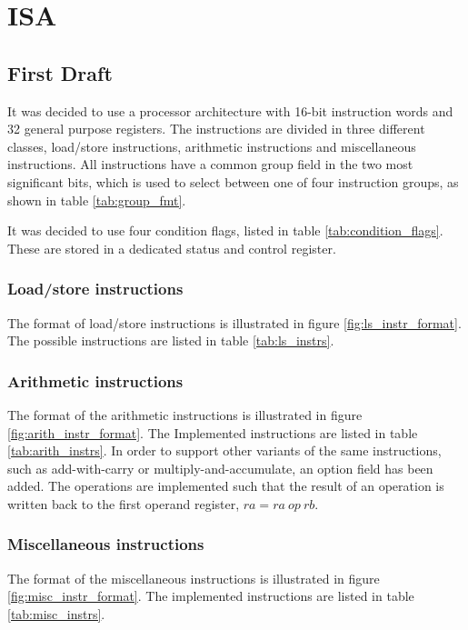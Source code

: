 \section{ISA}

\subsection{First Draft}
It was decided to use a processor architecture with 16-bit instruction words and 32 general purpose registers.
The instructions are divided in three different classes, load/store instructions, arithmetic instructions
and miscellaneous instructions. All instructions have a common group field in the two most significant bits,
which is used to select between one of four instruction groups, as shown in table \ref{tab:group_fmt}.

It was decided to use four condition flags, listed in table \ref{tab:condition_flags}. These are stored in
a dedicated status and control register.




\subsubsection{Load/store instructions}
The format of load/store instructions is illustrated in figure \ref{fig:ls_instr_format}. The possible
instructions are listed in table \ref{tab:ls_instrs}.




\subsubsection{Arithmetic instructions}
The format of the arithmetic instructions is illustrated in figure \ref{fig:arith_instr_format}. The Implemented
instructions are listed in table \ref{tab:arith_instrs}. In order to support other variants of the same instructions,
such as add-with-carry or multiply-and-accumulate, an option field has been added. The operations are implemented such
that the result of an operation is written back to the first operand register, $ra = ra~op~rb$.




\subsubsection{Miscellaneous instructions}
The format of the miscellaneous instructions is illustrated in figure \ref{fig:misc_instr_format}. The
implemented instructions are listed in table \ref{tab:misc_instrs}.

